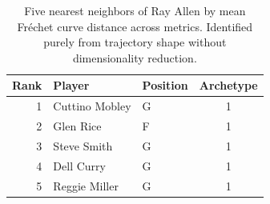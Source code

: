 \begin{table}[htbp]
  \centering\small
  \begin{tabular}{rllc}
    \toprule
    Rank & Player & Position & Archetype \\
    \midrule
    1 & Cuttino Mobley & G & 1 \\
    2 & Glen Rice & F & 1 \\
    3 & Steve Smith & G & 1 \\
    4 & Dell Curry & G & 1 \\
    5 & Reggie Miller & G & 1 \\
    \bottomrule
  \end{tabular}
  \caption{Five nearest neighbors of Ray Allen by mean Fr\'{e}chet curve distance across metrics. Identified purely from trajectory shape without dimensionality reduction.}
  \label{tab:Ray_Allen_frechet_curve_neighbors}
\end{table}

